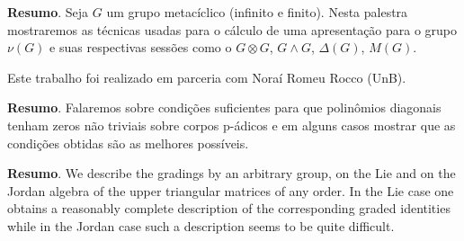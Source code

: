 	\noindent\textbf{Resumo}.\label{jsc} 
	Seja $G$ um grupo metac\'iclico (infinito e finito). Nesta palestra mostraremos as t\'ecnicas usadas para o c\'alculo de uma apresenta\c c\~ao para o grupo $\nu(G)$ e suas respectivas sessões como o $G\otimes G$, $G\wedge G$, $\Delta(G)$, $M(G)$. 
	
	\vspace*{0.5cm} \noindent Este trabalho foi realizado em parceria com Nora\'i Romeu Rocco (UnB).
	
	\vspace{24pt}
%
%
%
%	

	
	
	
	\noindent\textbf{Resumo}.\label{phar} 
	Falaremos sobre condições suficientes para que polinômios diagonais tenham zeros não triviais sobre corpos p-ádicos e em alguns casos mostrar que as condições obtidas são as melhores possíveis.
	
	\vspace{24pt}

	
	
	\noindent\textbf{Resumo}.\label{pk} 
	We describe the gradings by an arbitrary group, on the Lie and on the
	Jordan algebra of the upper triangular matrices of any order. In the Lie
	case one obtains a reasonably complete description of the corresponding
	graded identities while in the Jordan case such a description seems to be
	quite difficult.
	
